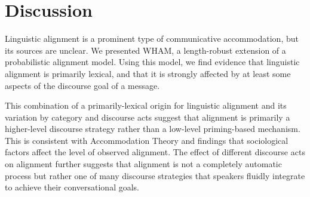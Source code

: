 \documentclass[11pt]{article}
\begin{document}
\section{Discussion}
Linguistic alignment is a prominent type of communicative accommodation, but its sources are unclear.  We presented WHAM, a length-robust extension of a probabilistic alignment model. Using this model, we find evidence that linguistic alignment is primarily lexical, and that it is strongly affected by at least some aspects of the discourse goal of a message.

This combination of a primarily-lexical origin for linguistic alignment and its variation by category and discourse acts suggest that alignment is primarily a higher-level discourse strategy rather than a low-level priming-based mechanism.  This is consistent with Accommodation Theory and findings that sociological factors affect the level of observed alignment.  The effect of different discourse acts on alignment further suggests that alignment is not a completely automatic process but rather one of many discourse strategies that speakers fluidly integrate to achieve their conversational goals. 






%

%
%
\newpage


\end{document}
